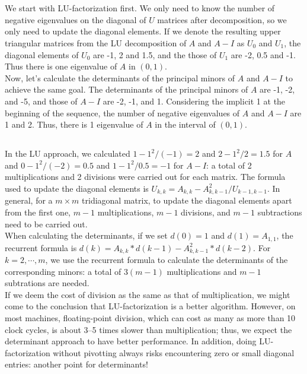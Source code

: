 \documentclass[11pt]{article}
\begin{document}
\maketitle
\section{}
\subsection{}
We start with LU-factorization first. We only need to know the number of negative eigenvalues on the diagonal of $U$ matrices after decomposition, so we only need to update the diagonal elements. If we denote the resulting upper triangular matrices from the LU decomposition of $A$ and $A-I$ as $U_0$ and $U_1$, the diagonal elements of $U_0$ are -1, 2 and 1.5, and the those of $U_1$ are -2, 0.5 and -1. Thus there is one eigenvalue of $A$ in $(0,1)$.\\[0.3cm]
Now, let's calculate the determinants of the principal minors of $A$ and $A-I$ to achieve the same goal. The determinants of the principal minors of $A$ are -1, -2, and -5, and those of $A-I$ are -2, -1, and 1. Considering the implicit 1 at the beginning of the sequence, the number of negative eigenvalues of $A$ and $A-I$ are 1 and 2. Thus, there is 1 eigenvalue of $A$ in the interval of $(0,1)$.

\subsection{}
In the LU approach, we calculated $1 - 1^2/(-1) = 2$ and $2 - 1^2/2 = 1.5$ for $A$ and $0-1^2/(-2) = 0.5$ and $1-1^2/0.5 = -1$ for $A-I$: a total of 2 multiplications and 2 divisions were carried out for each matrix. The formula used to update the diagonal elements is $U_{k,k} = A_{k,k} - A_{k,k-1}^2/U_{k-1,k-1}.$ In general, for a $m\times m$ tridiagonal matrix, to update the diagonal elements apart from the first one, $m-1$ multiplications, $m-1$ divisions, and $m-1$ subtractions need to be carried out.\\[0.3cm]
When calculating the determinants, if we set $d(0)=1$ and $d(1)=A_{1,1}$, the recurrent formula is $d(k) = A_{k,k}*d(k-1)-A_{k,k-1}^2*d(k-2)$. For $k=2,\cdots,m$, we use the recurrent formula to calculate the determinants of the corresponding minors: a total of $3(m-1)$ multiplications and $m-1$ subtrations are needed.\\[0.3cm]
If we deem the cost of division as the same as that of multiplication, we might come to the conclusion that LU-factorization is a better algorithm. However, on most machines, floating-point division, which can cost as many as more than 10 clock cycles, is about 3--5 times slower than multiplication; thus, we expect the determinant approach to have better performance. In addition, doing LU-factorization without pivotting always risks encountering zero or small diagonal entries: another point for determinants!
\end{document}
